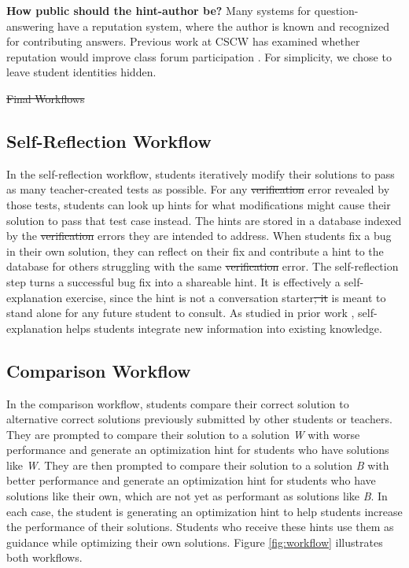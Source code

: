\documentclass[12pt,twoside]{mitthesis}
\providecommand{\DIFaddtex}[1]{{\protect\color{blue}\uwave{#1}}} %
\providecommand{\DIFdeltex}[1]{{\protect\color{red}\sout{#1}}}                      %
\providecommand{\DIFaddbegin}{} %
\providecommand{\DIFaddend}{} %
\providecommand{\DIFdelbegin}{} %
\providecommand{\DIFdelend}{} %
\providecommand{\DIFadd}[1]{\texorpdfstring{\DIFaddtex{#1}}{#1}} %
\providecommand{\DIFdel}[1]{\texorpdfstring{\DIFdeltex{#1}}{}} %
\begin{document}
{{{{{{{{{{{\DIFdelbegin %
\DIFdelend \DIFaddbegin \bf \DIFaddend How public should the hint-author be?} Many systems for question-answering have a reputation system, where the author is known and recognized for contributing answers. Previous work at CSCW has examined whether reputation would improve class forum participation \cite{reputation}. For simplicity, we chose to leave student identities hidden.

\DIFdelbegin %
\DIFdel{Final Workflows}%
\DIFdelend \DIFaddbegin \subsection{Self-Reflection Workflow} 

\DIFaddend In the self-reflection workflow, students iteratively modify their solutions to pass as many teacher-created tests as possible. For any \DIFdelbegin \DIFdel{verification }\DIFdelend \DIFaddbegin \DIFadd{autograder }\DIFaddend error revealed by those tests, students can look up hints for what modifications might cause their solution to pass that test case instead. The hints are stored in a database indexed by the \DIFdelbegin \DIFdel{verification }\DIFdelend \DIFaddbegin \DIFadd{autograder }\DIFaddend errors they are intended to address. When students fix a bug in their own solution, they can reflect on their fix and contribute a hint to the database for others struggling with the same \DIFdelbegin \DIFdel{verification }\DIFdelend \DIFaddbegin \DIFadd{autograder }\DIFaddend error. The self-reflection step turns a successful bug fix into a shareable hint. It is effectively a self-explanation exercise, since the hint is not a conversation starter\DIFdelbegin \DIFdel{; it }\DIFdelend \DIFaddbegin \DIFadd{. It }\DIFaddend is meant to stand alone for any future student to consult. As studied in prior work \cite{selfexplanation}, self-explanation helps students integrate new information into existing knowledge.

\DIFaddbegin \subsection{Comparison Workflow} 

\DIFaddend In the comparison workflow, students compare their correct solution to alternative correct solutions previously submitted by other students or teachers. They are prompted to compare their solution to a solution \textit{W} with worse performance and generate an optimization hint for students who have solutions like \textit{W}. They are then prompted to compare their solution to a solution \textit{B} with better performance and generate an optimization hint for students who have solutions like their own, which are not yet as performant as solutions like \textit{B}. In each case, the student is generating an optimization hint to help students increase the performance of their solutions. Students who receive these hints use them as guidance while optimizing their own solutions. Figure \ref{fig:workflow} illustrates both workflows.

}}}}}}}}}}
\end{document}
